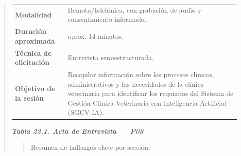 \documentclass[
]{article}
\begin{document}
\begin{quote}
{\begin{longtable}[]{|
  >{\raggedright\arraybackslash}p{}|
  >{\raggedright\arraybackslash}p{}|}
\begin{minipage}[t]{\linewidth}
\end{minipage} \\
\hline
\textbf{Modalidad} & \begin{minipage}[t]{\linewidth}\raggedright
Remota/telefónica, con grabación de audio y consentimiento informado.
\end{minipage} \\
\hline
\textbf{Duración aproximada} & \begin{minipage}[t]{\linewidth}\raggedright
aprox. 14 minutos.
\end{minipage} \\
\hline
\textbf{Técnica de elicitación} & \begin{minipage}[t]{\linewidth}\raggedright
Entrevista semiestructurada.
\end{minipage} \\
\hline
\textbf{Objetivo de la sesión} & \begin{minipage}[t]{\linewidth}\raggedright
Recopilar información sobre los procesos clínicos, administrativos y las necesidades de la clínica veterinaria para identificar los requisitos del Sistema de Gestión Clínica Veterinaria con Inteligencia Artificial (SGCV-IA).
\end{minipage} \\
\hline
\end{longtable}
}

\protect{}\label{_bookmark_P03_acta}{}\emph{\textbf{Tabla 23.1. Acta de Entrevista --- P03}}

\begin{quote}
Resumen de hallazgos clave por sección:
\end{quote}


\end{quote}
\end{document}
